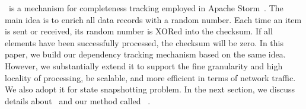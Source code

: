 \acker\ is a mechanism for completeness tracking employed in Apache Storm~\cite{apache:storm}. The main idea is to enrich all data records with a random number. Each time an item is sent or received, its random number is XORed into the checksum. If all elements have been successfully processed, the checksum will be zero. In this paper, we build our dependency tracking mechanism based on the same idea. However, we substantially extend it to support the fine granularity and high locality of processing, be scalable, and more efficient in terms of network traffic. We also adopt it for state snapshotting problem. In the next section, we discuss details about \acker\ and our method called \tracker\ .